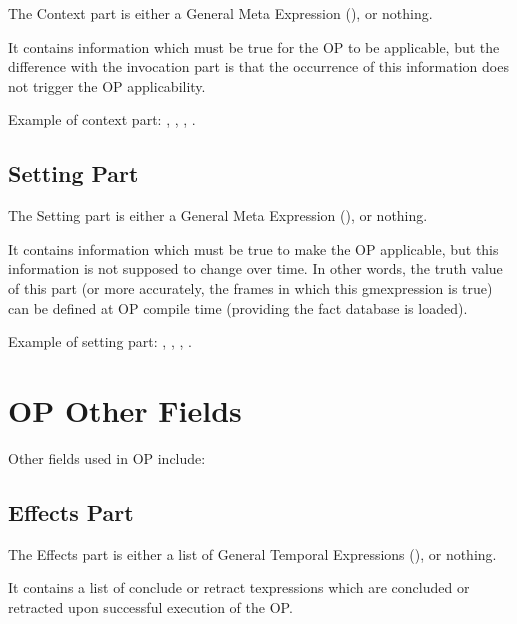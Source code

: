 The Context part is either a General Meta Expression (), or nothing.

It contains information which must be true for the OP to be applicable, but the
difference with the invocation part is that the occurrence of this information
does not trigger the OP applicability.

Example of context part: \*
, \*
, \*
, \*
.

\subsection{Setting Part}

The Setting part is either a General Meta Expression (), or nothing.

It contains information which must be true to make the OP applicable, but
this information is not supposed to change over time. In other words, the
truth value of this part (or more accurately, the frames in which this
gmexpression is true) can be defined at OP compile time (providing the
fact database is loaded).

Example of setting part: \*
, \*
, \*
, \*
.

\section{OP Other Fields}

Other fields used in OP include:


\subsection{Effects Part}

The Effects part is either a list of General Temporal Expressions
(), or nothing.

It contains a list of conclude or retract texpressions which are
concluded or retracted upon successful execution of the OP.

